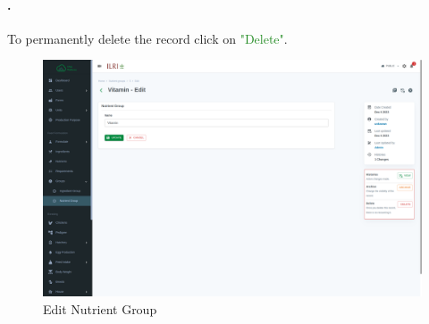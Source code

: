 \paragraph{.}To permanently delete the record click on \textcolor{ForestGreen}{"Delete"}.

\begin{figure}[h!]
  	\includegraphics[width=15cm]{screenshots/nutrient_group_edit_page.png}
  	\caption{Edit Nutrient Group}
  	\label{fig:nutrient_group_edit_page}
\end{figure}